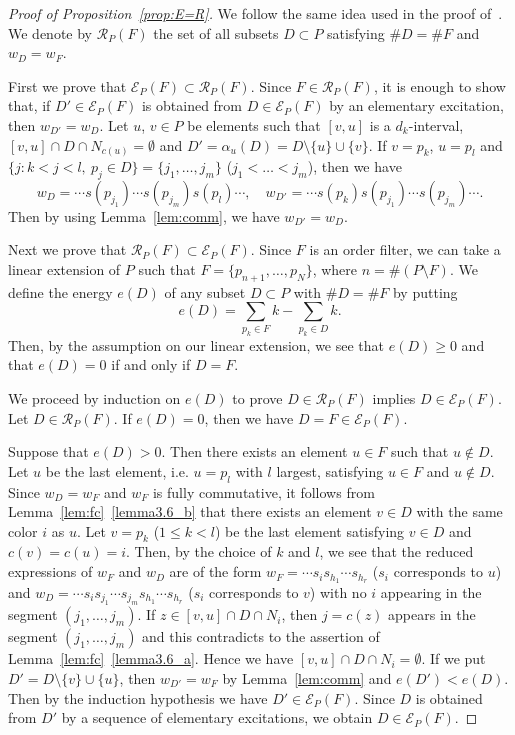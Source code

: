 \documentclass[ALCO,ThmDefs,Unicode,epreuves]{cedram}
\newcommand\EE{\mathcal{E}}
\newcommand\RR{\mathcal{R}}
\begin{document}
\begin{proof}[Proof of Proposition~\ref{prop:E=R}]
We follow the same idea used in the proof of~\cite[Proposition~4.8]{GK}.
We denote by $\RR_P(F)$ the set of all subsets $D \subset P$ satisfying $\# D = \# F$ and $w_D = w_F$.

First we prove that $\EE_P(F) \subset \RR_P(F)$.
Since $F \in \RR_P(F)$, it is enough to show that, 
if $D' \in \EE_P(F)$ is obtained from $D \in \EE_P(F)$ by an elementary excitation, 
then $w_{D'} = w_D$.
Let $u$, $v \in P$ be elements such that $[v,u]$ is a $d_k$-interval, 
$[v,u] \cap D \cap N_{c(u)} = \emptyset$ and 
$D' = \alpha_u(D) = D \setminus \{ u \} \cup \{ v \}$.
If $v = p_k$, $u = p_l$ and $\{ j : k < j < l, \ p_j \in D \} = \{ j_1, \dots, j_m \}$ 
($j_1 < \dots < j_m$), then we have
$$
w_D = \cdots s(p_{j_1}) \cdots s(p_{j_m}) s(p_l) \cdots,
\quad
w_{D'} = \cdots s(p_k) s(p_{j_1}) \cdots s(p_{j_m}) \cdots.
$$
Then by using Lemma~\ref{lem:comm}, we have $w_{D'} = w_D$.

Next we prove that $\RR_P(F) \subset \EE_P(F)$.
Since $F$ is an order filter, we can take a linear extension of $P$ 
such that $F = \{ p_{n+1}, \ldots, p_N \}$, where $n = \# (P \setminus F)$.
We define the energy $e(D)$ of any subset $D \subset P$ with $\# D = \# F$ by putting
$$
e(D) = \sum_{p_k \in F} k - \sum_{p_k \in D} k.
$$
Then, by the assumption on our linear extension, 
we see that $e(D) \ge 0$ and that $e(D) = 0$ if and only if $D = F$.

We proceed by induction on $e(D)$ to prove $D \in \RR_P(F)$ implies $D \in \EE_P(F)$.
Let $D \in \RR_P(F)$.
If $e(D) = 0$, then we have $D = F \in \EE_P(F)$.

Suppose that $e(D) > 0$.
Then there exists an element $u \in F$ such that $u \not\in D$.
Let $u$ be the last element, i.e. $u = p_l$ with $l$ largest, 
satisfying $u \in F$ and $u \not\in D$.
Since $w_D = w_F$ and $w_F$ is fully commutative, it follows from Lemma~\ref{lem:fc}~\ref{lemma3.6_b} %
that there exists an element $v \in D$ with the same color $i$ as $u$.
Let $v = p_k$ ($1 \le k < l$) be the last element satisfying $v \in D$ and $c(v) = c(u) = i$.
Then, by the choice of $k$ and $l$, we see that the reduced expressions of $w_F$ and $w_D$
are of the form $w_F = \cdots s_i s_{h_1} \cdots s_{h_r}$ ($s_i$ corresponds to $u$) 
and $w_D = \cdots s_i s_{j_1} \cdots s_{j_m} s_{h_1} \cdots s_{h_r}$ ($s_i$ corresponds to $v$) 
with no $i$ appearing in the segment $(j_1, \dots, j_m)$.
If $z \in [v,u] \cap D \cap N_i$, then $j = c(z)$ appears in the segment $(j_1, \dots, j_m)$ 
and this contradicts to the assertion of Lemma~\ref{lem:fc}~\ref{lemma3.6_a}.
Hence we have $[v,u] \cap D \cap N_i = \emptyset$.
If we put $D' = D \setminus \{ v \} \cup \{ u \}$,
then $w_{D'} = w_F$ by Lemma~\ref{lem:comm} and $e(D') < e(D)$.
Then by the induction hypothesis we have $D' \in \EE_P(F)$.
Since $D$ is obtained from $D'$ by a sequence of elementary excitations, 
we obtain $D \in \EE_P(F)$.
\end{proof}
\end{document}
